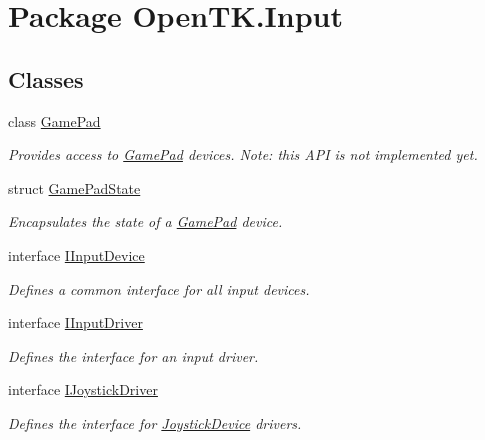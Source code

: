 \hypertarget{namespace_open_t_k_1_1_input}{\section{Package Open\-T\-K.\-Input}
\label{namespace_open_t_k_1_1_input}
}
\subsection*{Classes}
\begin{DoxyCompactItemize}
\item 
class \hyperlink{class_open_t_k_1_1_input_1_1_game_pad}{Game\-Pad}
\begin{DoxyCompactList}\small\item\em Provides access to \hyperlink{class_open_t_k_1_1_input_1_1_game_pad}{Game\-Pad} devices. Note\-: this A\-P\-I is not implemented yet. \end{DoxyCompactList}\item 
struct \hyperlink{struct_open_t_k_1_1_input_1_1_game_pad_state}{Game\-Pad\-State}
\begin{DoxyCompactList}\small\item\em Encapsulates the state of a \hyperlink{class_open_t_k_1_1_input_1_1_game_pad}{Game\-Pad} device. \end{DoxyCompactList}\item 
interface \hyperlink{interface_open_t_k_1_1_input_1_1_i_input_device}{I\-Input\-Device}
\begin{DoxyCompactList}\small\item\em Defines a common interface for all input devices. \end{DoxyCompactList}\item 
interface \hyperlink{interface_open_t_k_1_1_input_1_1_i_input_driver}{I\-Input\-Driver}
\begin{DoxyCompactList}\small\item\em Defines the interface for an input driver. \end{DoxyCompactList}\item 
interface \hyperlink{interface_open_t_k_1_1_input_1_1_i_joystick_driver}{I\-Joystick\-Driver}
\begin{DoxyCompactList}\small\item\em Defines the interface for \hyperlink{class_open_t_k_1_1_input_1_1_joystick_device}{Joystick\-Device} drivers. \end{DoxyCompactList}\item 

\end{DoxyCompactItemize}
